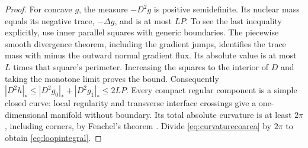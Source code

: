 \begin{proof}
For concave $g$, the measure $-D^2g$ is positive semidefinite. Its nuclear
mass equals its negative trace, $-\Delta g$, and is at most $LP$.
To see the last inequality explicitly, use inner parallel squares with
generic boundaries. The piecewise smooth divergence theorem, including
the gradient jumps, identifies the trace mass with minus the outward
normal gradient flux. Its absolute value is at most $L$ times that square's
perimeter. Increasing the squares to the interior of $D$ and taking the
monotone limit proves the bound. Consequently
$|D^2h|_*\le |D^2g_0|_*+|D^2g_1|_*\le2LP$.
Every compact regular component is a simple closed curve: local regularity
and transverse interface crossings give a one-dimensional manifold without
boundary. Its total absolute curvature is at least $2\pi$, including
corners, by Fenchel's theorem \cite[Theorem~2.4]{SullivanCurvature}.
Divide \eqref{eq:curvaturecoarea} by $2\pi$ to obtain
\eqref{eq:loopintegral}.
\end{proof}

